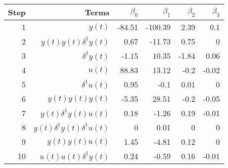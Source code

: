 \begin{tabular}{rrrrrr}
Step & Terms & $\beta_{0}$ & $\beta_{1}$ & $\beta_{2}$ & $\beta_{3}$ \\ 
\hline 
1 & $y(t)$ & -84.51 & -100.39 & 2.39 & 0.1 \\ 
2 & $y(t)y(t)\delta^1 y(t)$ & 0.67 & -11.73 & 0.75 & 0 \\ 
3 & $\delta^1 y(t)$ & -1.15 & 10.35 & -1.84 & 0.06 \\ 
4 & $u(t)$ & 88.83 & 13.12 & -0.2 & -0.02 \\ 
5 & $\delta^1 u(t)$ & 0.95 & -0.1 & 0.01 & 0 \\ 
6 & $y(t)y(t)y(t)$ & -5.35 & 28.51 & -0.2 & -0.05 \\ 
7 & $y(t)\delta^1 y(t)u(t)$ & 0.18 & -1.26 & 0.19 & -0.01 \\ 
8 & $y(t)\delta^1 y(t)\delta^1 u(t)$ & 0 & 0.01 & 0 & 0 \\ 
9 & $y(t)y(t)u(t)$ & 1.45 & -4.81 & 0.12 & 0 \\ 
10 & $u(t)u(t)\delta^1 y(t)$ & 0.24 & -0.59 & 0.16 & -0.01 \\ 
\hline 
\end{tabular}